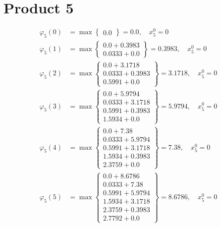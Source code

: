 \documentclass{article}
\begin{document}
\section{Product 5}
\begin{align*}
\varphi_{5}(0) &= \max \left\{ \begin{array}{c}
0.0
\end{array} \right\}=0.0, \quad x_{5}^0=0\\
  
\varphi_{5}(1) &= \max \left\{ \begin{array}{c}
0.0 + 0.3983 \\
 0.0333 + 0.0
\end{array} \right\}=0.3983, \quad x_{5}^0=0\\
  
\varphi_{5}(2) &= \max \left\{ \begin{array}{c}
0.0 + 3.1718 \\
 0.0333 + 0.3983 \\
 0.5991 + 0.0
\end{array} \right\}=3.1718, \quad x_{5}^0=0\\
  
\varphi_{5}(3) &= \max \left\{ \begin{array}{c}
0.0 + 5.9794 \\
 0.0333 + 3.1718 \\
 0.5991 + 0.3983 \\
 1.5934 + 0.0
\end{array} \right\}=5.9794, \quad x_{5}^0=0\\
  
\varphi_{5}(4) &= \max \left\{ \begin{array}{c}
0.0 + 7.38 \\
 0.0333 + 5.9794 \\
 0.5991 + 3.1718 \\
 1.5934 + 0.3983 \\
 2.3759 + 0.0
\end{array} \right\}=7.38, \quad x_{5}^0=0\\
  
\varphi_{5}(5) &= \max \left\{ \begin{array}{c}
0.0 + 8.6786 \\
 0.0333 + 7.38 \\
 0.5991 + 5.9794 \\
 1.5934 + 3.1718 \\
 2.3759 + 0.3983 \\
 2.7792 + 0.0
\end{array} \right\}=8.6786, \quad x_{5}^0=0\\
  

\end{align*}
\end{document}
